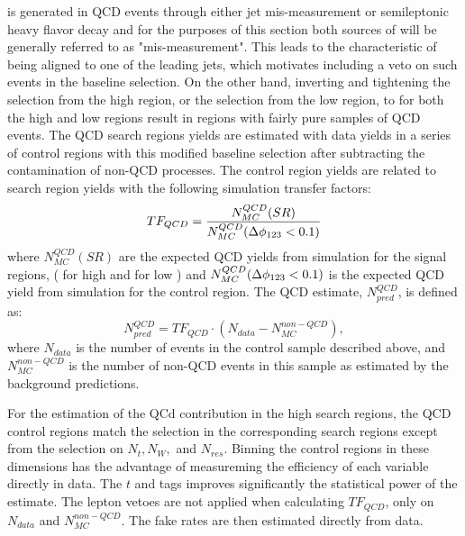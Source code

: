 \met{} is generated in QCD events through either jet \pt{} mis-measurement or semileptonic heavy flavor decay and for the purposes of this section both sources of \met{} will be generally referred to as "mis-measurement". This leads to the characteristic of \met{} being aligned to one of the leading jets, which motivates including a veto on such events in the baseline selection. On the other hand, inverting and tightening the \qcdhighdm{} selection from the high \dm{} region, or the \qcdlowdm{} selection from the low \dm{} region, to \qcdcr{} for both the high and low \dm{} regions result in regions with fairly pure samples of QCD events. The QCD search regions yields are estimated with data yields in a series of control regions with this modified baseline selection after subtracting the contamination of non-QCD processes. The control region yields are related to search region yields with the following simulation transfer factors:
\begin{equation}\label{QCDTF}
TF_{QCD}=\frac{N_{MC}^{QCD}(SR)}{N_{MC}^{QCD}(\Delta\phi_{123}<0.1)}
\end{equation}
where $N_{MC}^{QCD}(SR)$ are the expected QCD yields from simulation for the signal regions, (\qcdhighdm{} for high \dm{} and \qcdlowdm{} for low \dm) and $N_{MC}^{QCD}(\Delta\phi_{123}<0.1)$ is the expected QCD yield from simulation for the control region. The QCD estimate, $N_{pred}^{QCD}$, is defined as:
\begin{equation}
N_{pred}^{QCD}=TF_{QCD}\cdot(N_{data}-N_{MC}^{non-QCD}),
\end{equation}
where $N_{data}$ is the number of events in the \qcdcr{} control sample described above, and $N_{MC}^{non-QCD}$ is the number of non-QCD events in this sample as estimated by the background predictions.

For the estimation of the QCd contribution in the high \dm{} search regions, the QCD control regions match the selection in the corresponding search regions except from the selection on $N_t,N_W,$ and $N_{res}$. Binning the control regions in these dimensions has the advantage of measureming the efficiency of each variable directly in data. The $t$ and \W{} tags improves significantly the statistical power of the estimate. The lepton vetoes are not applied when calculating $TF_{QCD}$, only on $N_{data}$ and $N_{MC}^{non-QCD}$. The fake rates are then estimated directly from data. 

